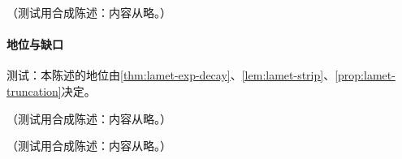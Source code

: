 \begin{proposition}\label{prop:yzliu-decay-extensions}
（测试用合成陈述：内容从略。）
\end{proposition}
\paragraph{地位与缺口}测试：本陈述的地位由\cref{thm:lamet-exp-decay}、\cref{lem:lamet-strip}、\cref{prop:lamet-truncation}决定。

\begin{remark}\label{rem:yzliu-relation-css}
（测试用合成陈述：内容从略。）
\end{remark}

\begin{remark}[开放问题]\label{rem:yzliu-open}
（测试用合成陈述：内容从略。）
\end{remark}
